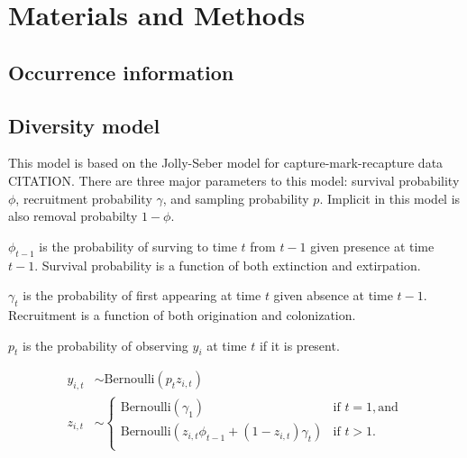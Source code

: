 \documentclass[12pt,letterpaper]{article}
\begin{document}
\section{Materials and Methods}

\subsection{Occurrence information}

\subsection{Diversity model}

This model is based on the Jolly-Seber model for capture-mark-recapture data CITATION. There are three major parameters to this model: survival probability \(\phi\), recruitment probability \(\gamma\), and sampling probability \(p\). Implicit in this model is also removal probabilty \(1 - \phi\).

\(\phi_{t - 1}\) is the probability of surving to time \(t\) from \(t - 1\) given presence at time \(t - 1\). Survival probability is a function of both extinction and extirpation.

\(\gamma_{t}\) is the probability of first appearing at time \(t\) given absence at time \(t - 1\). Recruitment is a function of both origination and colonization.

\(p_{t}\) is the probability of observing \(y_{i}\) at time \(t\) if it is present.


\begin{equation}
  \begin{aligned}
    y_{i,t} &\sim \mathrm{Bernoulli}(p_{t} z_{i, t}) \\
    z_{i, t} &\sim
    \begin{cases}
      \mathrm{Bernoulli}(\gamma_{1}) & \text{if } t = 1, \text{and} \\
      \mathrm{Bernoulli}(z_{i, t} \phi_{t - 1} + (1 - z_{i, t}) \gamma_{t}) & \text{if } t > 1. \\
    \end{cases}
  \end{aligned}
\end{equation}
\end{document}
